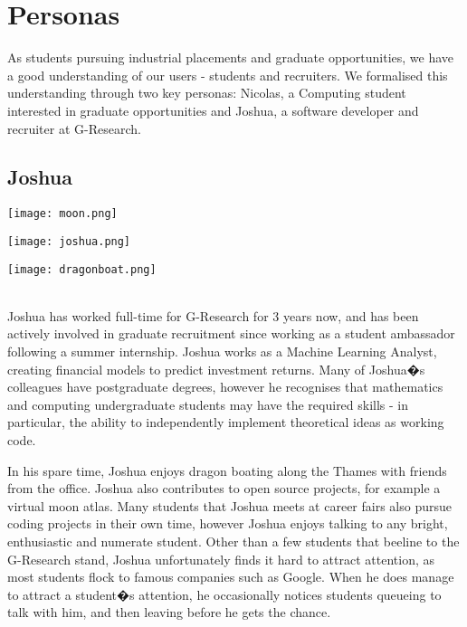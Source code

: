 \section{Personas}
As students pursuing industrial placements and graduate opportunities, we have a good understanding of our users - students and recruiters. We formalised this understanding through two key personas: Nicolas, a Computing student interested in graduate opportunities and Joshua, a software developer and recruiter at G-Research.
\subsection{Joshua}
\begin{minipage}{.333\textwidth}
  \centering
  \texttt{[image: moon.png]}
\end{minipage}%
\begin{minipage}{.333\textwidth}
  \centering
  \texttt{[image: joshua.png]}
\end{minipage}
\begin{minipage}{.333\textwidth}
  \centering
  \texttt{[image: dragonboat.png]}
\end{minipage}\\

Joshua has worked full-time for G-Research for 3 years now, and has been actively involved in graduate recruitment since working as a student ambassador following a summer internship. Joshua works as a Machine Learning Analyst, creating financial models to predict investment returns. Many of Joshua�s colleagues have postgraduate degrees, however he recognises that mathematics and computing undergraduate students may have the required skills - in particular, the ability to independently implement theoretical ideas as working code. 

In his spare time, Joshua enjoys dragon boating along the Thames with friends from the office. Joshua also contributes to open source projects, for example a virtual moon atlas. Many students that Joshua meets at career fairs also pursue coding projects in their own time, however Joshua enjoys talking to any bright, enthusiastic and numerate student. Other than a few students that beeline to the G-Research stand, Joshua unfortunately finds it hard to attract attention, as most students flock to famous companies such as Google. When he does manage to attract a student�s attention, he occasionally notices students queueing to talk with him, and then leaving before he gets the chance. 

